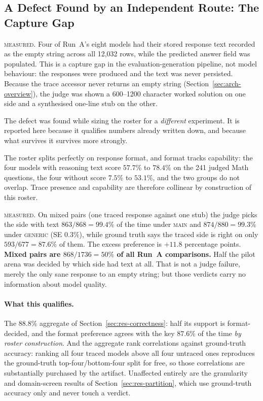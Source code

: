 \subsection{A Defect Found by an Independent Route: The Capture Gap}\label{sec:res-capture-gap}

\textsc{measured.} Four of Run~A's eight models had their stored
response text recorded as the empty string across all 12{,}032 rows,
while the predicted answer field was populated. This is a capture gap
in the evaluation-generation pipeline, not model behaviour: the
responses were produced and the text was never persisted. Because the
trace accessor never returns an empty string
(Section~\ref{sec:arch-overview}), the judge was shown a 600--1200
character worked solution on one side and a synthesised one-line stub
on the other.

The defect was found while sizing the roster for a \emph{different}
experiment. It is reported here because it qualifies numbers already
written down, and because what survives it survives more strongly.

The roster splits perfectly on response format, and format tracks
capability: the four models with reasoning text score $57.7\%$ to
$78.4\%$ on the 241 judged Math questions, the four without score
$7.5\%$ to $53.1\%$, and the two groups do not overlap. Trace presence
and capability are therefore collinear by construction of this roster.

\textsc{measured.} On mixed pairs (one traced response against one
stub) the judge picks the side with text $863/868 = 99.4\%$ of the
time under \textsc{main} and $874/880 = 99.3\%$ under
\textsc{generic} (SE $0.3\%$), while ground truth says the traced side
is right on only $593/677 = 87.6\%$ of them. The excess preference is
$+11.8$ percentage points. \textbf{Mixed pairs are $868/1736 = 50\%$ of
all Run~A comparisons.} Half the pilot arena was decided by which side
had text at all. That is not a judge failure, merely the only sane
response to an empty string; but those verdicts carry no information
about model quality.

\paragraph{What this qualifies.}
The $88.8\%$ aggregate of Section~\ref{sec:res-correctness}: half its
support is format-decided, and the format preference agrees with the
key $87.6\%$ of the time \emph{by roster construction}. And the
aggregate rank correlations against ground-truth accuracy: ranking all
four traced models above all four untraced ones reproduces the
ground-truth top-four/bottom-four split for free, so those correlations
are substantially purchased by the artifact. Unaffected entirely are
the granularity and domain-screen results of
Section~\ref{sec:res-partition}, which use ground-truth accuracy only
and never touch a verdict.

